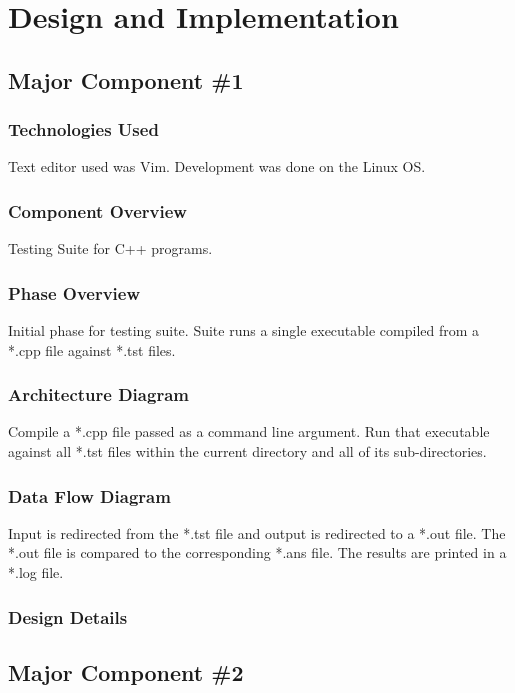\chapter{Design  and Implementation}

\section{Major Component \#1 }

\subsection{Technologies  Used}
Text editor used was Vim. Development was done on the Linux OS.

\subsection{Component  Overview}
Testing Suite for C++ programs.

\subsection{Phase Overview}
Initial phase for testing suite. Suite runs a single executable compiled from a *.cpp file against *.tst files.

\subsection{ Architecture  Diagram}
Compile a *.cpp file passed as a command line argument. Run that executable against all *.tst files within the
current directory and all of its sub-directories.


\subsection{Data Flow Diagram}
Input is redirected from the *.tst file and output is redirected to a *.out file. The *.out file is compared to the
corresponding *.ans file. The results are printed in a *.log file.


\subsection{Design Details}




\section{Major Component \#2 }

